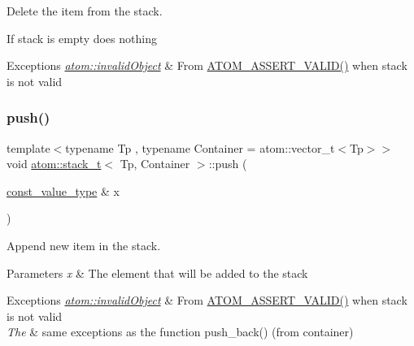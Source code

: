 Delete the item from the stack. 

If stack is empty does nothing 
\begin{DoxyExceptions}{Exceptions}
{\em \hyperlink{classatom_1_1invalid_object}{atom\+::invalid\+Object}} & From \hyperlink{debug__tools_8h_a273b49426c51bc6a7eb989ee0acbdc6b}{A\+T\+O\+M\+\_\+\+A\+S\+S\+E\+R\+T\+\_\+\+V\+A\+L\+I\+D()} when stack is not valid \\
\hline
\end{DoxyExceptions}
\mbox{\label{classatom_1_1stack__t_aebddf7b02c7317f9edc25741412fccb7}} 
\subsubsection{\texorpdfstring{push()}{push()}}
{\footnotesize\ttfamily template$<$typename Tp , typename Container  = atom\+::vector\+\_\+t$<$\+Tp$>$$>$ \\
void \hyperlink{classatom_1_1stack__t}{atom\+::stack\+\_\+t}$<$ Tp, Container $>$\+::push (\begin{DoxyParamCaption}\item[{\hyperlink{classatom_1_1stack__t_a780222269dc9f9323438ec4c56795735}{const\+\_\+value\+\_\+type} \&}]{x }\end{DoxyParamCaption})\hspace{0.3cm}{\ttfamily [inline]}}



Append new item in the stack. 


\begin{DoxyParams}{Parameters}
{\em x} & The element that will be added to the stack \\
\hline
\end{DoxyParams}

\begin{DoxyExceptions}{Exceptions}
{\em \hyperlink{classatom_1_1invalid_object}{atom\+::invalid\+Object}} & From \hyperlink{debug__tools_8h_a273b49426c51bc6a7eb989ee0acbdc6b}{A\+T\+O\+M\+\_\+\+A\+S\+S\+E\+R\+T\+\_\+\+V\+A\+L\+I\+D()} when stack is not valid \\
\hline
{\em The} & same exceptions as the function push\+\_\+back() (from container) \\
\hline
\end{DoxyExceptions}
\mbox{\label{classatom_1_1stack__t_a7ae2d64181c0dcc03a54ca5df4c0de75}} 
